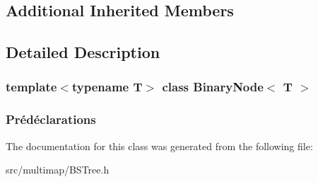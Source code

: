 \subsection*{Additional Inherited Members}


\subsection{Detailed Description}
\subsubsection*{template$<$typename T$>$\newline
class Binary\+Node$<$ T $>$}

\subsubsection*{Prédéclarations }

The documentation for this class was generated from the following file\+:\begin{DoxyCompactItemize}
\item 
src/multimap/B\+S\+Tree.\+h\end{DoxyCompactItemize}
